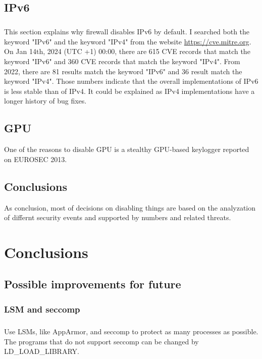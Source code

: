 \documentclass[mscthesis]{usiinfthesis}
\begin{document}
\section{IPv6}
\paragraph{}
This section explains why firewall disables IPv6 by default. I searched both the keyword "IPv6" and the keyword "IPv4" from the website \url{https://cve.mitre.org}. On Jan 14th, 2024 (UTC +1) 00:00, there are 615 CVE records that match the keyword "IPv6" and 360 CVE records that match the keyword "IPv4". From 2022, there are 81 results match the keyword "IPv6" and 36 result match the keyword "IPv4". Those numbers indicate that the overall implementations of IPv6 is less stable than of IPv4. It could be explained as IPv4 implementations have a longer history of bug fixes.

\section{GPU}
One of the reasons to disable GPU is a stealthy GPU-based keylogger reported on EUROSEC 2013. \citep{gpu:keylogger}

\section{Conclusions}
As conclusion, most of decisions on disabling things are based on the analyzation of differnt security events and supported by numbers and related threats.

\chapter{Conclusions}

\section{Possible improvements for future}
\subsection{LSM and seccomp}
\paragraph{}
Use LSMs, like AppArmor, and seccomp to protect as many processes as possible. The programs that do not support seccomp can be changed by LD\_LOAD\_LIBRARY.
\end{document}
